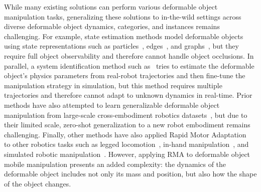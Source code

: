 While many existing solutions can perform various deformable object manipulation tasks, generalizing these solutions to in-the-wild settings across diverse deformable object dynamics, categories, and instances remains challenging. For example, state estimation methods model deformable objects using state representations such as particles~\cite{jaillet1998deformable,li2018learning}, edges~\cite{triantafyllou2016geometric,yuba2017unfolding}, and graphs~\cite{longhini2023edo,lippi2020latent}, but they require full object observability and therefore cannot handle object occlusions. In parallel, a system identification method such as~\cite{chebotar2019closing} tries to estimate the deformable object's physics parameters from real-robot trajectories and then fine-tune the manipulation strategy in simulation, but this method requires multiple trajectories and therefore cannot adapt to unknown dynamics in real-time. Prior methods have also attempted to learn generalizable deformable object manipulation from large-scale cross-embodiment robotics datasets~\cite{black2024pi0,kim2024openvla}, but due to their limited scale, zero-shot generalization to a new robot embodiment remains challenging. Finally, other methods have also applied Rapid Motor Adaptation~\cite{kumar2021rma} to other robotics tasks such as legged locomotion~\cite{kumar2022adapting}, in-hand manipulation~\cite{qi2023hand}, and simulated robotic manipulation~\cite{liang2024rapid}. However, applying RMA to deformable object mobile manipulation presents an added complexity: the dynamics of the deformable object includes not only its mass and position, but also how the shape of the object changes. 

